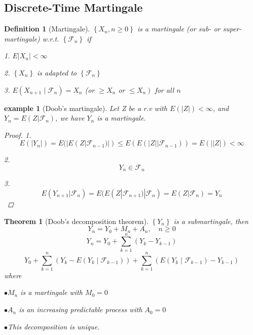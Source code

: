 \documentclass[a4]{article}
\newtheorem{theorem}{Theorem}
\newtheorem{definition}{Definition}
\newtheorem{example}{example}
\begin{document}
\subsection{Discrete-Time Martingale}
\begin{definition}[Martingale]\par 
\bigbreak
$\left\{X_{n}, n \geq 0\right\}$ is a martingale (or sub- or super-martingale) w.r.t. $\left\{\mathcal{F}_{n}\right\}$ if \par 
1. $E\left|X_{n}\right|<\infty$\par
2. $\left\{X_{n}\right\}$ is adapted to $\left\{\mathcal{F}_{n}\right\}$\par
3. $E\left(X_{n+1} \mid \mathcal{F}_{n}\right)=X_{n}$ (or $\geq X_{n}$ or $\left.\leq X_{n}\right)$ for all $n$\par
\end{definition}
\begin{example}[Doob's martingale]\par
	Let Z be a r.v with $E(|Z|)<\infty$, and $Y_{n} = E(Z|\mathcal{F}_{n})$, we have $Y_{n}$ is a martingale.\par 
	\begin{proof}\quad \par 
		1.
		\begin{equation}
		E(|Y_{n}|) = E(|E(Z|\mathcal{F}_{n-1})|)\leq E(E(|Z||\mathcal{F}_{n-1})) = E(||Z|)<\infty
		\end{equation}\par
		2. \begin{equation}
		Y_{n}\in \mathcal{F}_{n}
		\end{equation}\par 
		3. 
		\begin{equation}
		E(Y_{n+1}|\mathcal{F}_{n}) = E(E(Z|\mathcal{F}_{n+1})|\mathcal{F}_{n}) = E(Z|\mathcal{F}_{n}) = Y_{n}
		\end{equation}
	\end{proof}
\end{example}
\begin{theorem}[Doob's decomposition theorem]
	$\left\{Y_{n}\right\}$ is a submartingale, then
	$$
	Y_{n}=Y_{0}+M_{n}+A_{n}, \quad n \geq 0
	$$
	$$
Y_{n} = Y_{0} + \sum^{n}_{k = 1}(Y_{k} - Y_{k-1})
	$$
	$$
Y_{0}+\sum_{k=1}^{n}\left(Y_{k}-E\left(Y_{k} \mid \mathcal{F}_{k-1}\right)\right)+\sum_{k=1}^{n}\left(E\left(Y_{k} \mid \mathcal{F}_{k-1}\right)-Y_{k-1}\right)
	$$
	where\par 
	$\bullet M_{n}$ is a martingale with $M_{0}=0$\par 
	$\bullet A_{n}$ is an increasing predictable process with $A_{0}=0$\par 
	$\bullet$This decomposition is unique.\par 
	
\end{theorem}
\end{document}
